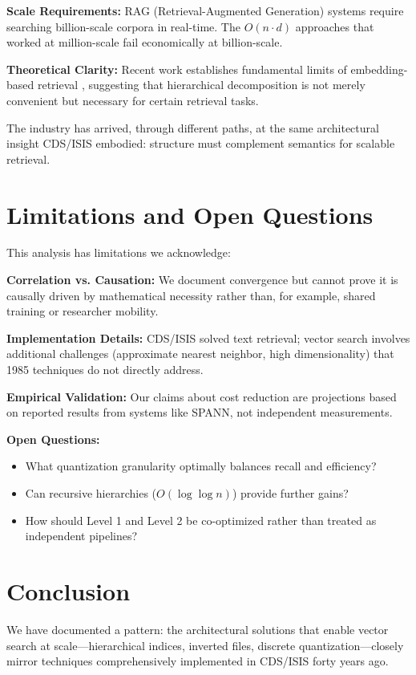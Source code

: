 \documentclass[manuscript,screen,nonacm]{acmart}
\begin{document}
\textbf{Scale Requirements:} RAG (Retrieval-Augmented Generation) systems require searching billion-scale corpora in real-time. The $O(n \cdot d)$ approaches that worked at million-scale fail economically at billion-scale.

\textbf{Theoretical Clarity:} Recent work establishes fundamental limits of embedding-based retrieval \cite{weller2025}, suggesting that hierarchical decomposition is not merely convenient but necessary for certain retrieval tasks.

The industry has arrived, through different paths, at the same architectural insight CDS/ISIS embodied: structure must complement semantics for scalable retrieval.

\section{Limitations and Open Questions}

This analysis has limitations we acknowledge:

\textbf{Correlation vs. Causation:} We document convergence but cannot prove it is causally driven by mathematical necessity rather than, for example, shared training or researcher mobility.

\textbf{Implementation Details:} CDS/ISIS solved text retrieval; vector search involves additional challenges (approximate nearest neighbor, high dimensionality) that 1985 techniques do not directly address.

\textbf{Empirical Validation:} Our claims about cost reduction are projections based on reported results from systems like SPANN, not independent measurements.

\textbf{Open Questions:}
\begin{itemize}
    \item What quantization granularity optimally balances recall and efficiency?
    \item Can recursive hierarchies ($O(\log \log n)$) provide further gains?
    \item How should Level 1 and Level 2 be co-optimized rather than treated as independent pipelines?
\end{itemize}

\section{Conclusion}

We have documented a pattern: the architectural solutions that enable vector search at scale---hierarchical indices, inverted files, discrete quantization---closely mirror techniques comprehensively implemented in CDS/ISIS forty years ago.
\end{document}
